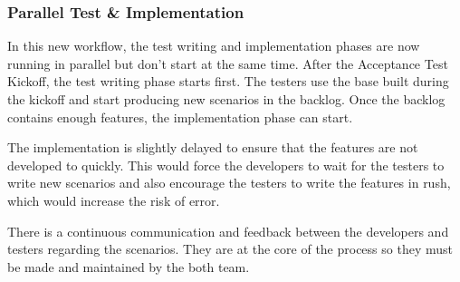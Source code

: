 \subsubsection{Parallel Test \& Implementation}
In this new workflow, the test writing and implementation phases are now
running in parallel but don't start at the same time.
After the Acceptance Test Kickoff, the test writing phase starts first.
The testers use the base built during the kickoff and start producing new
scenarios in the backlog.
Once the backlog contains enough features, the implementation phase can start.

The implementation is slightly delayed to ensure that the features are not
developed to quickly.
This would force the developers to wait for the testers to write new
scenarios and also encourage the testers to write the features in rush, which
would increase the risk of error.

There is a continuous communication and feedback between the developers and
testers regarding the scenarios.
They are at the core of the process so they must be made and maintained by
the both team.
